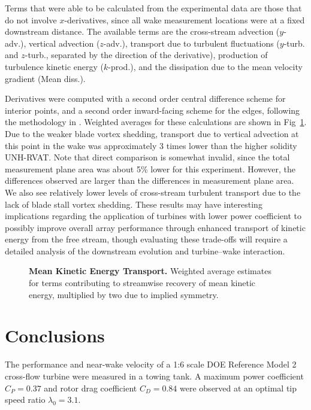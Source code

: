 \documentclass[10pt,letterpaper]{article}
\begin{document}
Terms that were able to be calculated from the experimental data are those that
do not involve $x$-derivatives, since all wake measurement locations were at a
fixed downstream distance. The available terms are the cross-stream advection
($y$-adv.), vertical advection ($z$-adv.), transport due to turbulent
fluctuations ($y$-turb. and $z$-turb., separated by the direction of the
derivative), production of turbulence kinetic energy ($k$-prod.), and the
dissipation due to the mean velocity gradient (Mean diss.).

Derivatives were computed with a second order central difference scheme for
interior points, and a second order inward-facing scheme for the edges,
following the methodology in \cite{Bachant2015-JoT}. Weighted averages for these
calculations are shown in Fig~\ref{fig:Ktransport}. Due to the weaker blade
vortex shedding, transport due to vertical advection at this point in the wake
was approximately 3 times lower than the higher solidity UNH-RVAT. Note that
direct comparison is somewhat invalid, since the total measurement plane area
was about 5\% lower for this experiment. However, the differences observed are
larger than the differences in measurement plane area. We also see relatively
lower levels of cross-stream turbulent transport due to the lack of blade stall
vortex shedding. These results may have interesting implications regarding the
application of turbines with lower power coefficient to possibly improve overall
array performance through enhanced transport of kinetic energy from the free
stream, though evaluating these trade-offs will require a detailed analysis of
the downstream evolution and turbine--wake interaction.

\begin{figure}

    \caption{{\bf Mean Kinetic Energy Transport.} Weighted average estimates for
    terms contributing to streamwise recovery of mean kinetic energy, multiplied
    by two due to implied symmetry.}

    \label{fig:Ktransport}
\end{figure}


\section*{Conclusions}

The performance and near-wake velocity of a 1:6 scale DOE Reference Model 2
cross-flow turbine were measured in a towing tank. A maximum power coefficient
$C_P = 0.37$ and rotor drag coefficient $C_D = 0.84$ were observed at an optimal
tip speed ratio $\lambda_0 = 3.1$.
\end{document}
